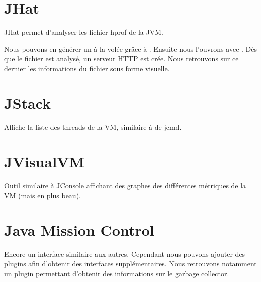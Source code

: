 \documentclass{report}
\begin{document}
		\section{JHat}
			JHat permet d'analyser les fichier hprof de la JVM.
			
			Nous pouvons en générer un à la volée grâce à .
			Ensuite nous l'ouvrons avec .
			Dès que le fichier est analysé, un serveur HTTP est crée.
			Nous retrouvons sur ce dernier les informations du fichier sous forme visuelle.
			
			
		\section{JStack}
			Affiche la liste des threads de la VM, similaire à  de jcmd.
			
		\section{JVisualVM}
			Outil similaire à JConsole affichant des graphes des différentes métriques de la VM (mais en plus beau).
			
		\section{Java Mission Control}
			Encore un interface similaire aux autres.
			Cependant nous pouvons ajouter des plugins afin d'obtenir des interfaces supplémentaires.
			Nous retrouvons notamment un plugin permettant d'obtenir des informations sur le garbage collector.
			
\end{document}
